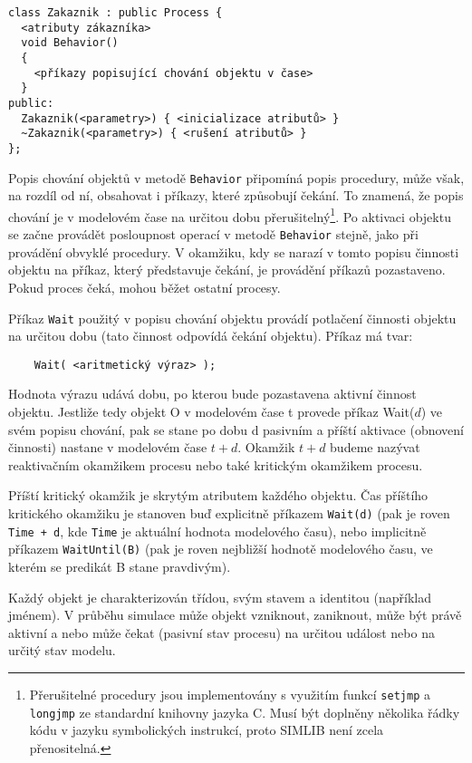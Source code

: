 \documentclass[a4paper]{article}
\begin{document}
\begin{verbatim}
class Zakaznik : public Process {
  <atributy zákazníka>
  void Behavior()
  {
    <příkazy popisující chování objektu v čase>
  }
public:
  Zakaznik(<parametry>) { <inicializace atributů> }
  ~Zakaznik(<parametry>) { <rušení atributů> }
};
\end{verbatim}

Popis chování objektů v metodě \verb|Behavior| připomíná popis procedury, může však,
na rozdíl od ní, obsahovat i příkazy, které způsobují čekání. To znamená, že
popis chování je v modelovém čase na určitou dobu
přerušitelný\footnote{Přerušitelné procedury jsou implementovány s využitím
funkcí \texttt{setjmp} a \texttt{longjmp} ze standardní knihovny jazyka C. Musí být doplněny
několika řádky kódu v jazyku symbolických instrukcí, proto SIMLIB není zcela
přenositelná.}. Po aktivaci objektu se začne provádět posloupnost operací v
metodě \verb|Behavior| stejně, jako při provádění obvyklé procedury. V okamžiku, kdy
se narazí v tomto popisu činnosti objektu na příkaz, který představuje
čekání, je provádění příkazů pozastaveno. Pokud proces čeká, mohou běžet
ostatní procesy. 

Příkaz \verb|Wait| použitý v popisu chování objektu provádí potlačení
činnosti objektu na určitou dobu (tato činnost odpovídá čekání
objektu). Příkaz má tvar:

\begin{verbatim}
    Wait( <aritmetický výraz> );
\end{verbatim}

Hodnota výrazu udává dobu, po kterou bude pozastavena aktivní
činnost objektu. Jestliže tedy objekt O v modelovém čase
t provede příkaz Wait($d$) ve svém popisu chování, pak se stane
po dobu d pasivním a příští aktivace (obnovení činnosti) nastane
v modelovém čase $t + d$. Okamžik $t + d$ budeme nazývat
reaktivačním okamžikem procesu nebo také kritickým okamžikem
procesu.

Příští kritický okamžik je skrytým atributem každého objektu.
Čas příštího kritického okamžiku je stanoven buď explicitně
příkazem \verb|Wait(d)| (pak je roven \verb|Time + d|, 
kde \verb|Time| je
aktuální hodnota modelového času), nebo implicitně příkazem
\verb|WaitUntil(B)| (pak je roven nejbližší hodnotě modelového času,
ve kterém se predikát B stane pravdivým).

Každý objekt je charakterizován třídou, svým stavem a identitou
(například jménem). V průběhu simulace může objekt vzniknout,
zaniknout, může být právě aktivní a nebo může čekat (pasivní
stav procesu) na určitou událost nebo na určitý stav modelu.
\end{document}
